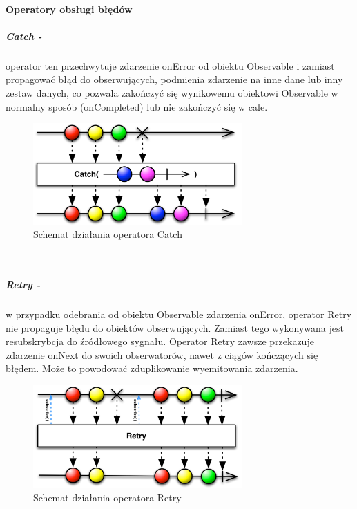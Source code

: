 \documentclass[12pt,oneside,a4paper]{report}
\begin{document}
\paragraph{Operatory obsługi błędów}
\subparagraph{Catch -}operator ten przechwytuje zdarzenie onError od obiektu Observable i zamiast propagować błąd do obserwujących, podmienia zdarzenie na inne dane lub inny zestaw danych, co pozwala zakończyć się wynikowemu obiektowi Observable w normalny sposób (onCompleted) lub nie zakończyć się w cale.
\begin{figure}[ht!]
	\centering
	\includegraphics[width=8cm]{catch}
	\caption{Schemat działania operatora Catch}
	\label{catch}
\end{figure}\\
\subparagraph{Retry -}w przypadku odebrania od obiektu Observable zdarzenia onError, operator Retry nie propaguje błędu do obiektów obserwujących. Zamiast tego wykonywana jest resubskrybcja do źródłowego sygnału. Operator Retry zawsze przekazuje zdarzenie onNext do swoich obserwatorów, nawet z ciągów kończących się błędem. Może to powodować zduplikowanie wyemitowania zdarzenia.
\begin{figure}[ht!]
	\centering
	\includegraphics[width=8cm]{retry}
	\caption{Schemat działania operatora Retry}
	\label{retry}
\end{figure}\\
\end{document}
